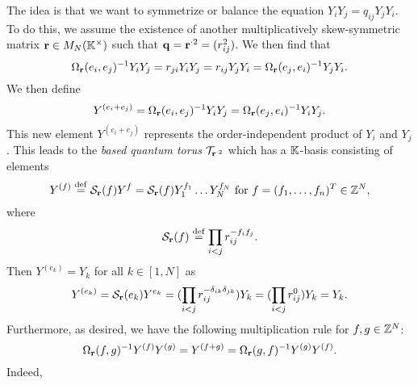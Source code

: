 The idea is that we want to symmetrize or balance the equation $Y_i Y_j = q_{ij} Y_j
	Y_i$. To do this, we assume the existence of another multiplicatively skew-symmetric
matrix $\mathbf{r} \in M_N(\mathbb{K}^\times)$ such that $\mathbf{q} = \mathbf{r}^{\cdot 2} = (r_{ij}^2)$. We
then find that
\begin{equation*}
	\Omega_{\mathbf{r}}(e_i, e_j)^{-1} Y_i Y_j = r_{ji} Y_i Y_j = r_{ij} Y_j Y_i = \Omega_{\mathbf{r}} (e_j, e_i)^{-1} Y_j Y_i.
\end{equation*}
%
We then define
\begin{equation*}
	Y^{(e_i + e_j)} = \Omega_{\mathbf{r}}(e_i, e_j)^{-1} Y_i Y_j = \Omega_{\mathbf{r}}(e_j, e_i)^{-1} Y_i Y_j.
\end{equation*}
%
This new element $Y^{(e_i + e_j)}$ represents the order-independent product of $Y_i$
and $Y_j$. This leads to the \emph{based quantum torus}
$\mathcal{T}_{\mathbf{r}^{\cdot 2}}$ which has a $\mathbb{K}$-basis consisting of elements
\begin{equation*}
	Y^{(f)} \overset{\mathrm{def}}{=} \mathcal{S}_{\mathbf{r}}(f)Y^f = \mathcal{S}_{\mathbf{r}}(f)Y_1^{f_1}\dots Y_N^{f_N}
	\text{ for } f = (f_1, \dots, f_n)^T \in \mathbb{Z}^N,
\end{equation*}
%
%
where
\begin{equation*}
	\mathcal{S}_{\mathbf{r}}(f) \overset{\mathrm{def}}{=} \prod_{i < j}r_{ij}^{-f_if_j}.
\end{equation*}
%
%
Then $Y^{(e_k)} = Y_k$ for all $k \in [1, N]$ as
\begin{align*}
	Y^{(e_k)}
	= \mathcal{S}_{\mathbf{r}}(e_k)Y^{e_k}
	= (\prod_{i < j}r_{ij}^{-\delta_{ik}\delta_{jk}} )Y_k
	= (\prod_{i < j}r_{ij}^0 )Y_k
	= Y_k.
\end{align*}
Furthermore, as desired, we have the following multiplication rule for $f,g \in \mathbb{Z}^N$:
\begin{equation*}
	\Omega_{\mathbf{r}}(f,g)^{-1} Y^{(f)}Y^{(g)} = Y^{(f+g)} = \Omega_{\mathbf{r}} (g, f)^{-1} Y^{(g)}Y^{(f)}.
\end{equation*}
Indeed,
